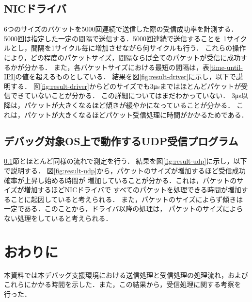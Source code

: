 \documentclass[12pt]{jsarticle}
\begin{document}
\subsection{NICドライバ}\label{result-driver}

6つのサイズのパケットを5000回連続で送信した際の受信成功率を計測する．
5000回は指定した一定の間隔で送信する．5000回連続で送信することを
1サイクルとし，間隔を1サイクル毎に増加させながら何サイクルも行う．
これらの操作により，どの程度のパケットサイズ，間隔ならば全てのパケットが受信に成功するかが分かる．
また，各パケットサイズにおける最短の間隔は，表\ref{time-until-IPI}の値を超えるものとしている．
結果を図\ref{fig:result-driver}に示し，以下で説明する．
図\ref{fig:result-driver}からどのサイズでも3μsまではほとんどパケットが受信できていないことが分かる．
この詳細についてはまだわかっていない．
3μs以降は，パケットが大きくなるほど傾きが緩やかになっていることが分かる．
これは，パケットが大きくなるほどパケット受信処理に時間がかかるためである．

\subsection{デバッグ対象OS上で動作するUDP受信プログラム}

\ref{result-driver}節とほとんど同様の流れで測定を行う．
結果を図\ref{fig:result-udp}に示し，以下で説明する．
図\ref{fig:result-udp}から，パケットのサイズが増加するほど受信成功確率が上昇し始める時間が
増加していることが分かる．これは，パケットのサイズが増加するほどNICドライバで
すべてのパケットを処理できる時間が増加することに起因していると考えられる．
また，パケットのサイズによらず傾きは一定である．このことから，ドライバ以降の処理は，
パケットのサイズによらない処理をしていると考えられる．

\section{おわりに}

本資料では本デバッグ支援環境における送信処理と受信処理の処理流れ，および
これらにかかる時間を示した．また，この結果から，受信処理に関する考察を
行った．
\end{document}

